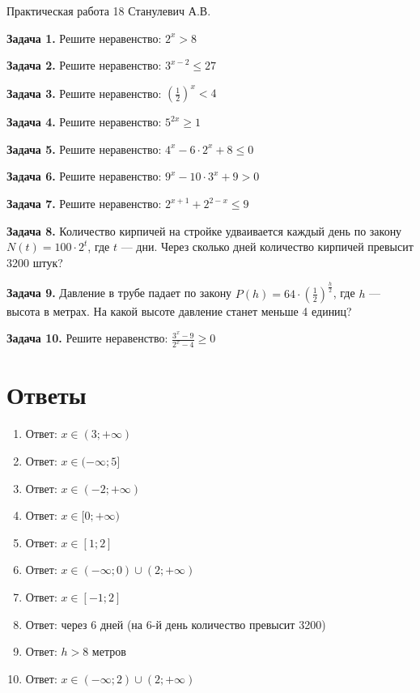 \documentclass{umk-matematika}
\begin{document}
\maketitlepage
    {Практическая работа 18}
    {}
    {Станулевич А.В.}

\textbf{Задача 1.} Решите неравенство: $2^x > 8$\par\vspace{10pt}
\textbf{Задача 2.} Решите неравенство: $3^{x-2} \le 27$\par\vspace{10pt}
\textbf{Задача 3.} Решите неравенство: $\left(\frac{1}{2}\right)^x < 4$\par\vspace{10pt}
\textbf{Задача 4.} Решите неравенство: $5^{2x} \ge 1$\par\vspace{10pt}
\textbf{Задача 5.} Решите неравенство: $4^{x} - 6 \cdot 2^{x} + 8 \le 0$\par\vspace{10pt}
\textbf{Задача 6.} Решите неравенство: $9^{x} - 10 \cdot 3^{x} + 9 > 0$\par\vspace{10pt}
\textbf{Задача 7.} Решите неравенство: $2^{x+1} + 2^{2-x} \le 9$\par\vspace{10pt}
\textbf{Задача 8.} Количество кирпичей на стройке удваивается каждый день по закону $N(t) = 100 \cdot 2^{t}$, где $t$ — дни. Через сколько дней количество кирпичей превысит 3200 штук?\par\vspace{10pt}
\textbf{Задача 9.} Давление в трубе падает по закону $P(h) = 64 \cdot \left(\frac{1}{2}\right)^{\frac{h}{2}}$, где $h$ — высота в метрах. На какой высоте давление станет меньше 4 единиц?\par\vspace{10pt}
\textbf{Задача 10.} Решите неравенство: $\frac{3^{x} - 9}{2^{x} - 4} \ge 0$\par\vspace{10pt}
\newpage
\section*{Ответы}

\begin{enumerate}
  \item Ответ: $x \in (3; +\infty)$
  \item Ответ: $x \in (-\infty; 5]$
  \item Ответ: $x \in (-2; +\infty)$
  \item Ответ: $x \in [0; +\infty)$
  \item Ответ: $x \in [1; 2]$
  \item Ответ: $x \in (-\infty; 0) \cup (2; +\infty)$
  \item Ответ: $x \in [-1; 2]$
  \item Ответ: через $6$ дней (на 6-й день количество превысит 3200)
  \item Ответ: $h > 8$ метров
  \item Ответ: $x \in (-\infty; 2) \cup (2; +\infty)$
\end{enumerate}
\end{document}
